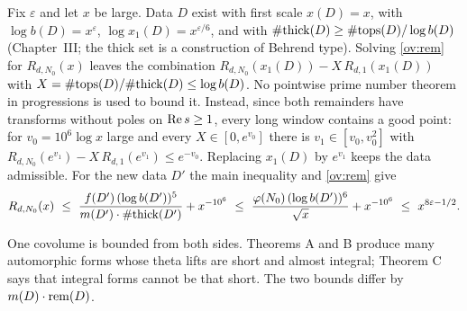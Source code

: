  Fix $\varepsilon$ and let $x$ be large. Data $D$ exist with first
scale $x(D)=x$, with $\log b(D)=x^{\varepsilon}$, $\log x_1(D)=x^{\varepsilon/6}$, and with
$\#\mathrm{thick}(D)\ge\#\mathrm{tops}(D)/\log b(D)$ (Chapter~III; the thick set is a construction of Behrend type). Solving
\eqref{ov:rem} for $R_{d,N_0}(x)$ leaves the combination $R_{d,N_0}(x_1(D))-X\,R_{d,1}(x_1(D))$ with
$X=\#\mathrm{tops}(D)/\#\mathrm{thick}(D)\le\log b(D)$. No pointwise prime number theorem in progressions is used to bound it.
Instead, since both remainders have transforms without poles on $\operatorname{Re} s\ge1$, every long window contains a good
point: for $v_0=10^6\log x$ large and every $X\in[0,e^{v_0}]$ there is $v_1\in[v_0,v_0^2]$ with
$R_{d,N_0}(e^{v_1})-X\,R_{d,1}(e^{v_1})\le e^{-v_0}$. Replacing $x_1(D)$ by $e^{v_1}$ keeps the data admissible. For the new
data $D'$ the main inequality and \eqref{ov:rem} give
\[
R_{d,N_0}(x)\ \le\ \frac{f(D')\,(\log b(D'))^5}{m(D')\cdot\#\ovthick(D')}+x^{-10^6}
\ \le\ \frac{\varphi(N_0)\,(\log b(D'))^6}{\sqrt x}+x^{-10^6}\ \le\ x^{8\varepsilon-1/2}.
\]


One covolume is bounded from both sides. Theorems A and B produce many automorphic forms whose theta lifts are short
and almost integral; Theorem C says that integral forms cannot be that short. The two bounds differ by
$m(D)\cdot\mathrm{rem}(D)$.

